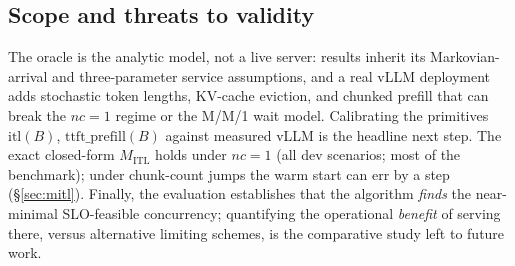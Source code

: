 \subsection{Scope and threats to validity}
\label{sec:exp-threats}
The oracle is the analytic model, not a live server: results inherit its Markovian-arrival and
three-parameter service assumptions, and a real vLLM deployment adds stochastic token lengths,
KV-cache eviction, and chunked prefill that can break the $nc=1$ regime or the M/M/1 wait model.
Calibrating the primitives $\mathrm{itl}(B)$, $\mathrm{ttft\_prefill}(B)$ against measured vLLM
is the headline next step. The exact closed-form $M_{\mathrm{ITL}}$ holds under $nc=1$ (all dev
scenarios; most of the benchmark); under chunk-count jumps the warm start can err by a step
(\S\ref{sec:mitl}). Finally, the evaluation establishes that the algorithm \emph{finds} the
near-minimal SLO-feasible concurrency; quantifying the operational \emph{benefit} of serving
there, versus alternative limiting schemes, is the comparative study left to future work.
